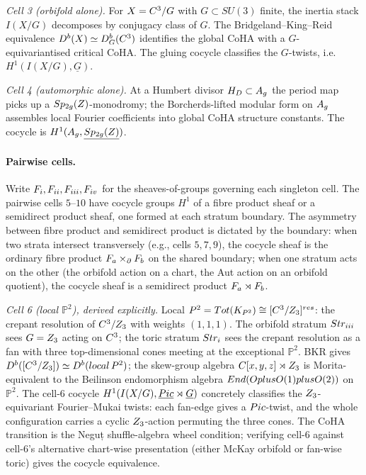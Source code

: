 \emph{Cell 3 (orbifold alone).} For $X=C^{3}/G$ with
$G\subset SU(3)$ finite, the inertia stack $I(X/G)$ decomposes by
conjugacy class of $G$. The Bridgeland--King--Reid equivalence
$D^{b}(X)\simeq D^{b}_{G}(C^{3})$ identifies the global CoHA with a
$G$-equivariantised critical CoHA. The gluing cocycle classifies the
$G$-twists, i.e. $H^{1}(I(X/G),\underline{G})$.

\emph{Cell 4 (automorphic alone).} At a Humbert divisor
$H_{D}\subset A_{g}$ the period map picks up a
$Sp_{2g}(Z)$-monodromy; the Borcherds-lifted modular form on
$A_{g}$ assembles local Fourier coefficients into global CoHA
structure constants. The cocycle is
$H^{1}(A_{g},\underline{Sp_{2g}(Z)})$.

\paragraph{Pairwise cells.} Write $F_{i},F_{ii},F_{iii},F_{iv}$
for the sheaves-of-groups governing each singleton cell. The pairwise
cells $5$--$10$ have cocycle groups $H^{1}$ of a fibre product sheaf
or a semidirect product sheaf, one formed at each stratum boundary.
The asymmetry between fibre product and semidirect product is dictated
by the boundary: when two strata intersect transversely (e.g., cells
$5,7,9$), the cocycle sheaf is the ordinary fibre product
$F_{a}\times_{\partial}F_{b}$ on the shared boundary; when one
stratum acts on the other (the orbifold action on a chart, the Aut
action on an orbifold quotient), the cocycle sheaf is a semidirect
product $F_{a}\rtimes F_{b}$.

\emph{Cell 6 (local $\mathbb{P}^{2}$), derived explicitly.} Local
$P^{2}=Tot(K_{P^{2}})\cong
[C^{3}/Z_{3}]^{res}$: the crepant resolution of
$C^{3}/Z_{3}$ with weights $(1,1,1)$. The orbifold stratum
$Str_{iii}$ sees $G=Z_{3}$ acting on $C^{3}$; the toric stratum
$Str_{i}$ sees the crepant resolution as a fan with three
top-dimensional cones meeting at the exceptional $\mathbb{P}^{2}$.
BKR gives $D^{b}([C^{3}/Z_{3}])\simeq D^{b}(local\,
P^{2})$; the skew-group algebra
$C[x,y,z]\rtimes Z_{3}$ is Morita-equivalent to the Beilinson
endomorphism algebra $End(OplusO(1)plusO(2))$ on
$\mathbb{P}^{2}$. The cell-$6$ cocycle $H^{1}(I(X/G),\underline{Pic}
\rtimes\underline{G})$ concretely classifies the $Z_{3}$-equivariant
Fourier--Mukai twists: each fan-edge gives a $Pic$-twist, and the
whole configuration carries a cyclic $Z_{3}$-action permuting the
three cones. The CoHA transition is the Neguț shuffle-algebra wheel
condition; verifying cell-$6$ against cell-$6$'s alternative chart-wise
presentation (either McKay orbifold or fan-wise toric) gives the
cocycle equivalence.

